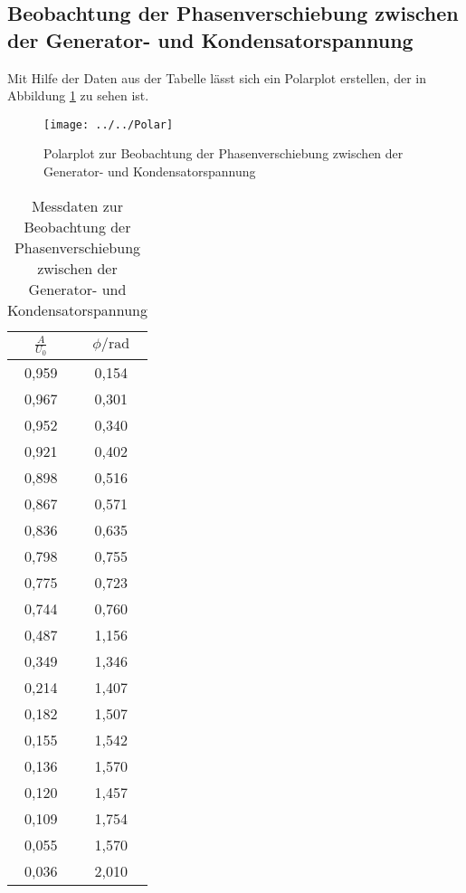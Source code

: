 \subsection{Beobachtung der Phasenverschiebung zwischen der Generator- und Kondensatorspannung}
Mit Hilfe der Daten aus der Tabelle  lässt sich ein Polarplot erstellen, der in Abbildung \ref{fig:polar} zu sehen ist. 
\begin{figure}[h!]
	\centering
	\texttt{[image: ../../Polar]}
	\caption{Polarplot zur Beobachtung der Phasenverschiebung zwischen der Generator- und Kondensatorspannung }
	\label{fig:polar}
\end{figure}
\begin{table}[htbp]
	\centering
	\caption{Messdaten zur Beobachtung der Phasenverschiebung zwischen der Generator- und Kondensatorspannung}
	\label{tab:Polarplot}
	\begin{tabular}{c c}
		\toprule
		$\frac{A}{U_0} $ & $\phi / \text{rad}$ \\
		\midrule
		0,959 &	0,154 \\
		0,967 &	0,301 \\
		0,952 &	0,340 \\
		0,921 &	0,402 \\ 
		0,898 &	0,516 \\
		0,867 &	0,571 \\
		0,836 &	0,635 \\
		0,798 &	0,755 \\
		0,775 &	0,723 \\
		0,744 &	0,760 \\
		0,487 &	1,156 \\
		0,349 &	1,346 \\
		0,214 &	1,407 \\
		0,182 &	1,507 \\
		0,155 &	1,542 \\
		0,136 &	1,570 \\
		0,120 &	1,457 \\
		0,109 &	1,754 \\
		0,055 &	1,570 \\
		0,036 &	2,010 \\
		\bottomrule
	\end{tabular}
\end{table}
\FloatBarrier
